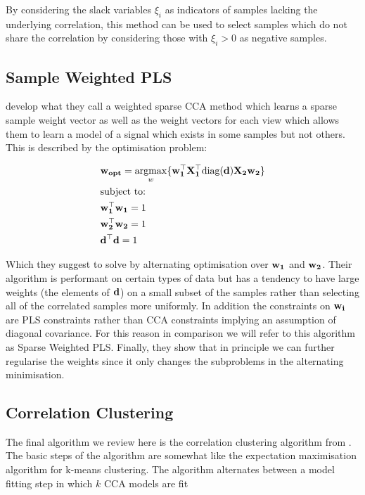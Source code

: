 By considering the slack variables $\xi_i$ as indicators of samples lacking the underlying correlation, this method can be used to select samples which do not share the correlation by considering those with $\xi_i > 0$ as negative samples.

\subsection{Sample Weighted PLS}\label{Sample Weighted PLS}
\cite{wenwen2018sparse} develop what they call a weighted sparse CCA method which learns a sparse sample weight vector as well as the weight vectors for each view which allows them to learn a model of a signal which exists in some samples but not others. This is described by the optimisation problem:

\begin{align}
    & \bold{w_{opt}}=\underset{w}{\mathrm{argmax}}\{ \bold{w_1^{\top}X_1^{\top}\text{diag}(d)X_2w_2  }\}\\
    & \text{subject to:} \notag\\
    & \bold{w_1^{\top}w_1}=1 \notag\\
    & \bold{w_2^{\top}w_2}=1 \notag\\
    & \bold{d^{\top}d}=1 \notag
\end{align}

Which they suggest to solve by alternating optimisation over $\bold{w_1}$ and $\bold{w_2}$. Their algorithm is performant on certain types of data but has a tendency to have large weights (the elements of $\bold{d}$) on a small subset of the samples rather than selecting all of the correlated samples more uniformly. In addition the constraints on $\bold{w_i}$ are PLS constraints rather than CCA constraints implying an assumption of diagonal covariance. For this reason in comparison we will refer to this algorithm as Sparse Weighted PLS. Finally, they show that in principle we can further regularise the weights since it only changes the subproblems in the alternating minimisation.


\subsection{Correlation Clustering}\label{sec:corrclus}

The final algorithm we review here is the correlation clustering algorithm from \cite{fern2005correlation}. The basic steps of the algorithm are somewhat like the expectation maximisation algorithm for k-means clustering. The algorithm alternates between a model fitting step in which $k$ CCA models are fit 

